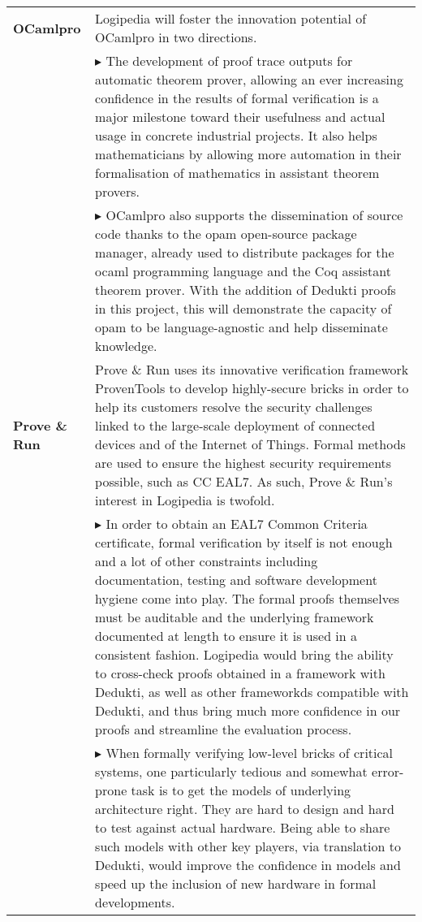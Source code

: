 \begin{longtable*}{|p{0.10\textwidth}|p{0.85\textwidth}|}
\hline

{\bf OCamlpro} &

Logipedia will foster the innovation
potential of OCamlpro in two directions.\\

&
$\blacktriangleright$
The development of proof trace
outputs for automatic theorem prover, allowing an ever increasing
confidence in the results of formal verification is a major milestone
toward their usefulness and actual usage in concrete industrial
projects. It also helps mathematicians by allowing more automation in
their formalisation of mathematics in assistant theorem provers.
\\

&
$\blacktriangleright$
OCamlpro also supports the dissemination of source code thanks to
the opam open-source package manager, already used to distribute packages
for the ocaml programming language and the Coq assistant theorem prover.
With the addition of Dedukti proofs in this project, this will demonstrate
the capacity of opam to be language-agnostic and help disseminate knowledge.
\\

\hline
{\bf Prove \& Run} &

Prove \& Run uses its innovative verification framework ProvenTools
to develop highly-secure bricks in order to help its customers resolve
the security challenges linked to the large-scale deployment of
connected devices and of the Internet of Things. Formal methods
are used to ensure the highest security requirements possible, such
as CC EAL7. As such, Prove \& Run's interest in Logipedia is
twofold.\\

&
$\blacktriangleright$
In order to obtain an EAL7 Common Criteria certificate, formal
verification by itself is not enough and a lot of other constraints
including documentation, testing and software development hygiene come
into play. The formal proofs themselves must be auditable and the underlying
framework documented at length to ensure it is used in a consistent fashion.
Logipedia would bring the ability to cross-check proofs obtained in a
framework with Dedukti, as well as other frameworkds compatible with
Dedukti, and thus bring much more confidence in our proofs and streamline
the evaluation process.\\

&
$\blacktriangleright$
When formally verifying low-level bricks of critical systems, one
particularly tedious and somewhat error-prone task is to get the models
of underlying architecture right. They are hard to design and hard to
test against actual hardware. Being able to share such models with
other key players, via translation to Dedukti, would improve the confidence
in models and speed up the inclusion of new hardware in formal developments.\\
    

\end{longtable*}
